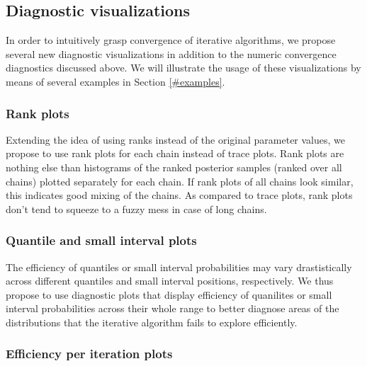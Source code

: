 \documentclass[american,]{article}
\begin{document}
\hypertarget{diagnostic-visualizations}{%
\subsection{Diagnostic visualizations}\label{diagnostic-visualizations}}

In order to intuitively grasp convergence of iterative algorithms, we
propose several new diagnostic visualizations in addition to the numeric
convergence diagnostics discussed above. We will illustrate the usage of
these visualizations by means of several examples in Section
\ref{#examples}.

\hypertarget{rank-plots}{%
\subsubsection{Rank plots}\label{rank-plots}}

Extending the idea of using ranks instead of the original parameter
values, we propose to use rank plots for each chain instead
of trace plots. Rank plots are nothing else than histograms of the
ranked posterior samples (ranked over all chains) plotted separately for
each chain. If rank plots of all chains look similar, this indicates
good mixing of the chains. As compared to trace plots, rank plots don't
tend to squeeze to a fuzzy mess in case of long chains.

\hypertarget{quantile-and-small-interval-plots}{%
\subsubsection{Quantile and small interval
plots}\label{quantile-and-small-interval-plots}}

The efficiency of quantiles or small interval probabilities may vary
drastistically across different quantiles and small interval positions,
respectively. We thus propose to use diagnostic plots that display
efficiency of quanilites or small interval probabilities across their
whole range to better diagnose areas of the distributions that the
iterative algorithm fails to explore efficiently.

\hypertarget{efficiency-change-plots}{%
\subsubsection{Efficiency per iteration plots}\label{efficiency-change-plots}}
\end{document}
